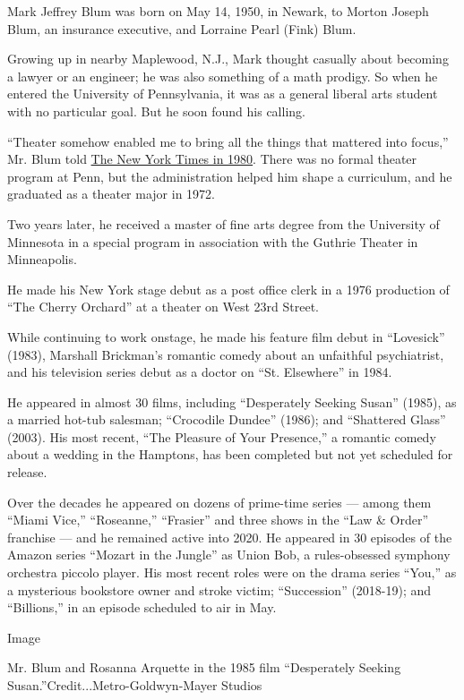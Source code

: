 Mark Jeffrey Blum was born on May 14, 1950, in Newark, to Morton Joseph
Blum, an insurance executive, and Lorraine Pearl (Fink) Blum.

Growing up in nearby Maplewood, N.J., Mark thought casually about
becoming a lawyer or an engineer; he was also something of a math
prodigy. So when he entered the University of Pennsylvania, it was as a
general liberal arts student with no particular goal. But he soon found
his calling.

``Theater somehow enabled me to bring all the things that mattered into
focus,'' Mr. Blum told
\href{https://timesmachine.nytimes3xbfgragh.onion/timesmachine/1980/02/01/114019644.pdf?pdf_redirect=true\&ip=0}{The
New York Times in 1980}. There was no formal theater program at Penn,
but the administration helped him shape a curriculum, and he graduated
as a theater major in 1972.

Two years later, he received a master of fine arts degree from the
University of Minnesota in a special program in association with the
Guthrie Theater in Minneapolis.

He made his New York stage debut as a post office clerk in a 1976
production of ``The Cherry Orchard'' at a theater on West 23rd Street.

While continuing to work onstage, he made his feature film debut in
``Lovesick'' (1983), Marshall Brickman's romantic comedy about an
unfaithful psychiatrist, and his television series debut as a doctor on
``St. Elsewhere'' in 1984.

He appeared in almost 30 films, including ``Desperately Seeking Susan''
(1985), as a married hot-tub salesman; ``Crocodile Dundee'' (1986); and
``Shattered Glass'' (2003). His most recent, ``The Pleasure of Your
Presence,'' a romantic comedy about a wedding in the Hamptons, has been
completed but not yet scheduled for release.

Over the decades he appeared on dozens of prime-time series --- among
them ``Miami Vice,'' ``Roseanne,'' ``Frasier'' and three shows in the
``Law \& Order'' franchise --- and he remained active into 2020. He
appeared in 30 episodes of the Amazon series ``Mozart in the Jungle'' as
Union Bob, a rules-obsessed symphony orchestra piccolo player. His most
recent roles were on the drama series ``You,'' as a mysterious bookstore
owner and stroke victim; ``Succession'' (2018-19); and ``Billions,'' in
an episode scheduled to air in May.

Image

Mr. Blum and Rosanna Arquette in the 1985 film ``Desperately Seeking
Susan.''Credit...Metro-Goldwyn-Mayer Studios

